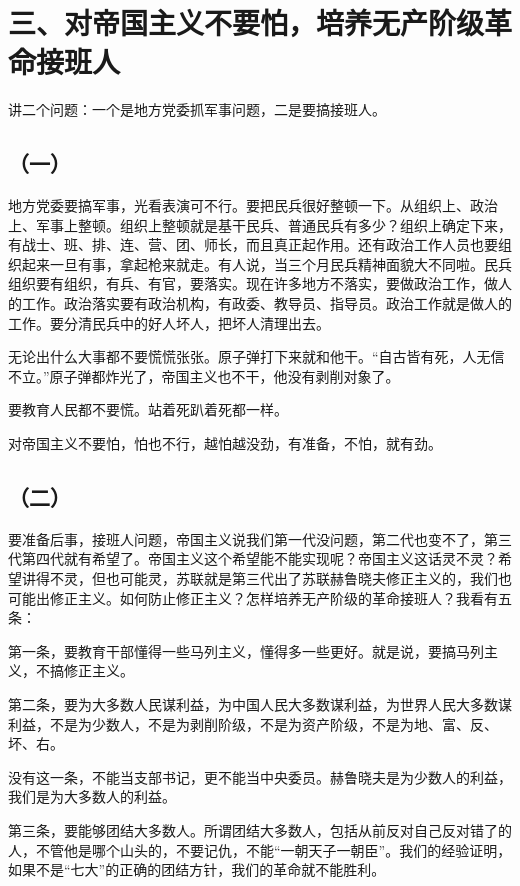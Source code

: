\section{三、对帝国主义不要怕，培养无产阶级革命接班人}

讲二个问题：一个是地方党委抓军事问题，二是要搞接班人。

\subsection*{（一）}

地方党委要搞军事，光看表演可不行。要把民兵很好整顿一下。从组织上、政治上、军事上整顿。组织上整顿就是基干民兵、普通民兵有多少？组织上确定下来，有战士、班、排、连、营、团、师长，而且真正起作用。还有政治工作人员也要组织起来一旦有事，拿起枪来就走。有人说，当三个月民兵精神面貌大不同啦。民兵组织要有组织，有兵、有官，要落实。现在许多地方不落实，要做政治工作，做人的工作。政治落实要有政治机构，有政委、教导员、指导员。政治工作就是做人的工作。要分清民兵中的好人坏人，把坏人清理出去。

无论出什么大事都不要慌慌张张。原子弹打下来就和他干。“自古皆有死，人无信不立。”原子弹都炸光了，帝国主义也不干，他没有剥削对象了。

要教育人民都不要慌。站着死趴着死都一样。

对帝国主义不要怕，怕也不行，越怕越没劲，有准备，不怕，就有劲。

\subsection*{（二）}

要准备后事，接班人问题，帝国主义说我们第一代没问题，第二代也变不了，第三代第四代就有希望了。帝国主义这个希望能不能实现呢？帝国主义这话灵不灵？希望讲得不灵，但也可能灵，苏联就是第三代出了苏联赫鲁晓夫修正主义的，我们也可能出修正主义。如何防止修正主义？怎样培养无产阶级的革命接班人？我看有五条：

第一条，要教育干部懂得一些马列主义，懂得多一些更好。就是说，要搞马列主义，不搞修正主义。

第二条，要为大多数人民谋利益，为中国人民大多数谋利益，为世界人民大多数谋利益，不是为少数人，不是为剥削阶级，不是为资产阶级，不是为地、富、反、坏、右。

没有这一条，不能当支部书记，更不能当中央委员。赫鲁晓夫是为少数人的利益，我们是为大多数人的利益。

第三条，要能够团结大多数人。所谓团结大多数人，包括从前反对自己反对错了的人，不管他是哪个山头的，不要记仇，不能“一朝天子一朝臣”。我们的经验证明，如果不是“七大”的正确的团结方针，我们的革命就不能胜利。


